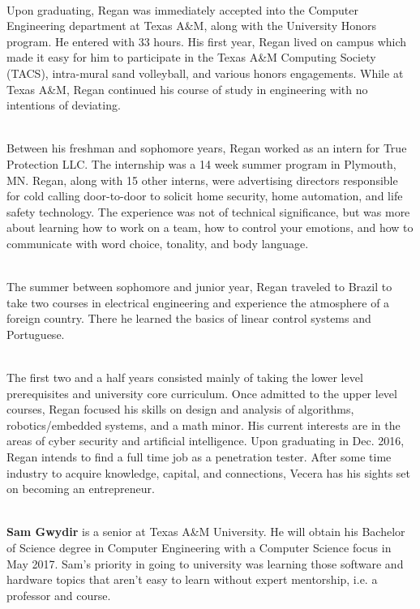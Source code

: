 \documentclass[12pt]{extarticle}
\begin{document}
\ \\
Upon graduating, Regan was immediately accepted into the Computer Engineering department at Texas A\&M, along with the University Honors program. He entered with 33 hours. His first year, Regan lived on campus which made it easy for him to participate in the Texas A\&M Computing Society (TACS), intra-mural sand volleyball, and various honors engagements.  While at Texas A\&M, Regan continued his course of study in engineering with no intentions of deviating. 

\ \\
Between his freshman and sophomore years, Regan worked as an intern for True Protection LLC. The internship was a 14 week summer program in Plymouth, MN. Regan, along with 15 other interns, were advertising directors responsible for cold calling door-to-door to solicit home security, home automation, and life safety technology. The experience was not of technical significance, but was more about learning how to work on a team, how to control your emotions, and how to communicate with word choice, tonality, and body language.

\ \\    
The summer between sophomore and junior year, Regan traveled to Brazil to take two courses in electrical engineering and experience the atmosphere of a foreign country. There he learned the basics of linear control systems and Portuguese. 

\ \\    
The first two and a half years consisted mainly of taking the lower level prerequisites and university core curriculum. Once admitted to the upper level courses, Regan focused his skills on design and analysis of algorithms, robotics/embedded systems, and a math minor. His current interests are in the areas of cyber security and artificial intelligence. Upon graduating in Dec. 2016, Regan intends to find a full time job as a penetration tester. After some time industry to acquire knowledge, capital, and connections, Vecera has his sights set on becoming an entrepreneur.  

\ \\
{\large \textbf{Sam Gwydir}} is a senior at Texas A\&M University. He will obtain his Bachelor of Science degree in Computer Engineering with a Computer Science focus in May 2017. Sam's priority in going to university was learning those software and hardware topics that aren't easy to learn without expert mentorship, i.e. a professor and course.
\end{document}
